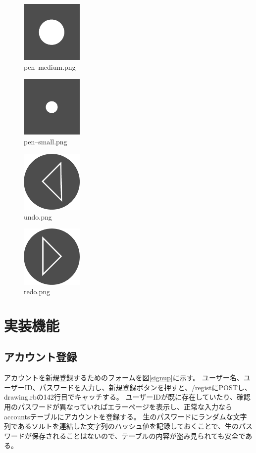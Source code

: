 \documentclass[a4j,titlepage]{jsarticle}
\begin{document}
\begin{figure}[H]
  \centering
  \includegraphics[width=3cm]{../public/image/pen-medium.png}
  \caption{pen--medium.png}
  \label{fig:penmedium}
\end{figure}

\begin{figure}[H]
  \centering
  \includegraphics[width=3cm]{../public/image/pen-small.png}
  \caption{pen--small.png}
  \label{fig:pensmall}
\end{figure}

\begin{figure}[H]
  \centering
  \includegraphics[width=3cm]{../public/image/undo.png}
  \caption{undo.png}
  \label{fig:undo}
\end{figure}

\begin{figure}[H]
  \centering
  \includegraphics[width=3cm]{../public/image/redo.png}
  \caption{redo.png}
  \label{fig:redo}
\end{figure}


\section{実装機能}
\subsection{アカウント登録}
アカウントを新規登録するためのフォームを図\ref{signup}に示す。
ユーザー名、ユーザーID、パスワードを入力し、新規登録ボタンを押すと、/registにPOSTし、drawing.rbの142行目でキャッチする。
ユーザーIDが既に存在していたり、確認用のパスワードが異なっていればエラーページを表示し、正常な入力ならaccountsテーブルにアカウントを登録する。
生のパスワードにランダムな文字列であるソルトを連結した文字列のハッシュ値を記録しておくことで、生のパスワードが保存されることはないので、テーブルの内容が盗み見られても安全である。
\end{document}
